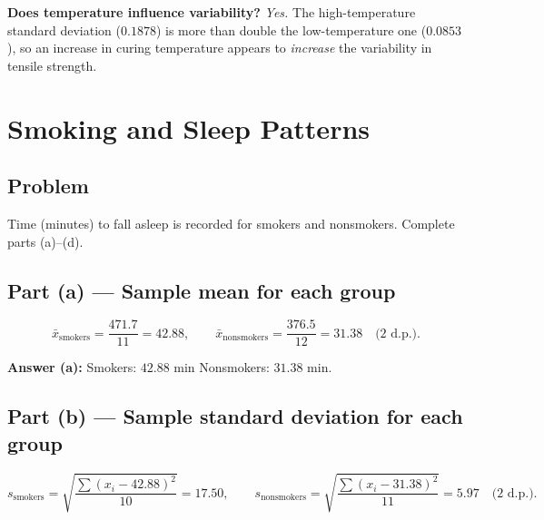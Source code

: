 \documentclass[11pt]{article}
\begin{document}
\noindent
\textbf{Does temperature influence variability?} \emph{Yes.} The high-temperature
standard deviation ($0.1878$) is more than double the low-temperature one
($0.0853$), so an increase in curing temperature appears to \emph{increase} the
variability in tensile strength.


\section{Smoking and Sleep Patterns}

\subsection*{Problem}
Time (minutes) to fall asleep is recorded for smokers and nonsmokers. Complete
parts (a)–(d).

\begin{table}[H]
\centering
\renewcommand{\arraystretch}{1.25}
\caption{Minutes to fall asleep.}
\end{table}

\subsection*{Part (a) — Sample mean for each group}
\[
\bar{x}_{\text{smokers}}=\frac{471.7}{11}=42.88,\qquad
\bar{x}_{\text{nonsmokers}}=\frac{376.5}{12}=31.38
\quad\text{(2 d.p.)}.
\]

\begin{answerbox}
\textbf{Answer (a):}\quad
Smokers: $42.88$ min \qquad Nonsmokers: $31.38$ min.
\end{answerbox}

\subsection*{Part (b) — Sample standard deviation for each group}
\[
s_{\text{smokers}}=\sqrt{\frac{\sum (x_i-42.88)^2}{10}}=17.50,\qquad
s_{\text{nonsmokers}}=\sqrt{\frac{\sum (x_i-31.38)^2}{11}}=5.97
\quad\text{(2 d.p.)}.
\]
\end{document}
